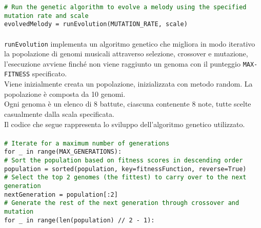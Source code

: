\documentclass[a4paper,12pt]{report}
\begin{document}
\texttt{\small\textcolor{darkgreen}{\# Run the genetic algorithm to evolve a melody using the specified mutation rate and scale}} \\
\texttt{\small evolvedMelody = runEvolution(MUTATION\_RATE, scale)} \\
\\
\texttt{runEvolution} implementa un algoritmo genetico che migliora in modo iterativo la popolazione di genomi musicali attraverso selezione, crossover e mutazione, l'esecuzione avviene finché non viene raggiunto un genoma con il punteggio \texttt{MAX-FITNESS} specificato. \\
Viene inizialmente creata un popolazione, inizializzata con metodo random. La popolazione è composta da 10 genomi. \\
Ogni genoma è un elenco di 8 battute, ciascuna contenente 8 note, tutte scelte casualmente dalla scala specificata. \\
Il codice che segue rappresenta lo sviluppo dell'algoritmo genetico utilizzato. \\
\\
\texttt{\small\textcolor{darkgreen}{\# Iterate for a maximum number of generations}} \\
\texttt{\small for \_ in range(MAX\_GENERATIONS):} \\

\indent        \texttt{\small\textcolor{darkgreen}{\# Sort the population based on fitness scores in descending order}} \\
\indent        \texttt{\small population = sorted(population, key=fitnessFunction, reverse=True)} \\
        
\indent        \texttt{\small\textcolor{darkgreen}{\# Select the top 2 genomes (the fittest) to carry over to the next generation}} \\
\indent        \texttt{\small nextGeneration = population[:2]} \\

\indent        \texttt{\small\textcolor{darkgreen}{\# Generate the rest of the next generation through crossover and mutation}} \\
\indent        \texttt{\small for \_ in range(len(population) // 2 - 1):} \\
\end{document}
